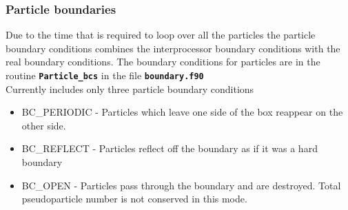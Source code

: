 \documentclass[12pt,a4paper]{article}
\newcommand{\inlinecode}[1]{{\color{warwickred} \bf\texttt{#1}}}
\newcommand{\EPOCH}{{\color{warwickdark}\fontfamily{phv}\selectfont{EPOCH}}}
\begin{document}
\subsubsection{Particle boundaries}
Due to the time that is required to loop over all the particles the particle
boundary conditions {\EPOCH} combines the interprocessor boundary conditions with
the real boundary conditions. The boundary conditions for particles are in the
routine \inlinecode{Particle\_bcs} in the file \inlinecode{boundary.f90} \\
Currently {\EPOCH} includes only three particle boundary conditions
\begin{itemize}
\item BC\_PERIODIC - Particles which leave one side of the box reappear on the
  other side.
\item BC\_REFLECT - Particles reflect off the boundary as if it was a hard
  boundary
\item BC\_OPEN - Particles pass through the boundary and are destroyed. Total
  pseudoparticle number is not conserved in this mode.
\end{itemize}
\end{document}
